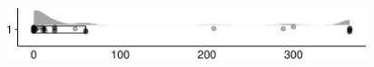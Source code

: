 \documentclass[
]{article}
\begin{document}
\begin{minipage}[t]{0.3\linewidth}

~

\end{minipage}%
\begin{minipage}[t]{0.7\linewidth}

\includegraphics[width=396px]{codebook_template_files/figure-latex/q7_36_rainplot-1}

\end{minipage}
 \vspace*{-5mm} 

\begin{minipage}[t]{0.3\linewidth}

~

\end{minipage}%
\begin{minipage}[t]{0.7\linewidth}

~

\end{minipage}
 \vspace*{-7mm} 
\end{document}
